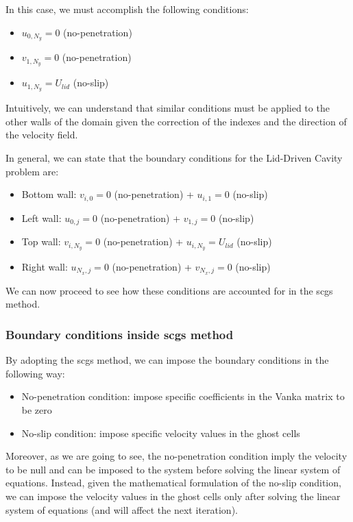 In this case, we must accomplish the following conditions:

\begin{itemize}
    \item $u_{0, N_y} = 0$ (no-penetration)
    \item $v_{1, N_y} = 0$ (no-penetration)
    \item $u_{1, N_y} = U_{lid}$ (no-slip)
\end{itemize}

Intuitively, we can understand that similar conditions must be applied to the other walls of the domain given the correction of the indexes and the direction of the velocity field.

In general, we can state that the boundary conditions for the Lid-Driven Cavity problem are:

\begin{itemize}
    \item Bottom wall: $v_{i,0} = 0$ (no-penetration) + $u_{i,1} = 0$ (no-slip)
    \item Left wall: $u_{0,j} = 0$ (no-penetration) + $v_{1,j} = 0$ (no-slip)
    \item Top wall: $v_{i,N_y} = 0$ (no-penetration) + $u_{i,N_y} = U_{lid}$ (no-slip)
    \item Right wall: $u_{N_x,j} = 0$ (no-penetration) + $v_{N_x,j} = 0$ (no-slip)
\end{itemize}

We can now proceed to see how these conditions are accounted for in the \acrshort{scgs} method.



\subsubsection{Boundary conditions inside \acrshort{scgs} method}

By adopting the \acrshort{scgs} method, we can impose the boundary conditions in the following way:

\begin{itemize}
    \item No-penetration condition: impose specific coefficients in the Vanka matrix to be zero
    \item No-slip condition: impose specific velocity values in the ghost cells
\end{itemize}

Moreover, as we are going to see, the no-penetration condition imply the velocity to be null and can be imposed to the system before solving the linear system of equations.
Instead, given the mathematical formulation of the no-slip condition, we can impose the velocity values in the ghost cells only after solving the linear system of equations (and will affect the next iteration).

